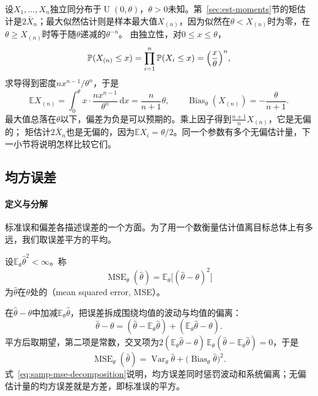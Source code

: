 \begin{example}[均匀分布端点的估计]
\label{ex:samp-uniform-maximum-bias}
设$X_1,\dots,X_n$独立同分布于$\operatorname{U}(0,\theta)$，$\theta>0$未知。第~\ref{sec:est-moments}节的矩估计是$2\bar X_n$；最大似然估计则是样本最大值$X_{(n)}$，因为似然在$\theta<X_{(n)}$时为零，在$\theta\geq X_{(n)}$时等于随$\theta$递减的$\theta^{-n}$。
由独立性，对$0\leq x\leq\theta$，
\[
  \mathbb{P}(X_{(n)}\leq x)=\prod_{i=1}^n\mathbb{P}(X_i\leq x)=\Bigl(\frac x\theta\Bigr)^n,
\]
求导得到密度$nx^{n-1}/\theta^n$，于是
\[
  \mathbb{E}X_{(n)}=\int_0^\theta x\cdot\frac{nx^{n-1}}{\theta^n}\,\mathrm{d}x=\frac{n}{n+1}\theta,\qquad
  \operatorname{Bias}_\theta(X_{(n)})=-\frac{\theta}{n+1}.
\]
最大值总落在$\theta$以下，偏差为负是可以预期的。乘上因子得到$\frac{n+1}{n}X_{(n)}$，它是无偏的；
矩估计$2\bar X_n$也是无偏的，因为$\mathbb{E}X_i=\theta/2$。同一个参数有多个无偏估计量，下一小节将说明怎样比较它们。
\end{example}

\subsection{均方误差}
\label{sec:samp-mse}

\paragraph{定义与分解}
标准误和偏差各描述误差的一个方面。为了用一个数衡量估计值离目标总体上有多远，我们取误差平方的平均。

\begin{definition}[均方误差]
\label{def:samp-mse}
设$\mathbb{E}_\theta\hat\theta^2<\infty$。称
\[
  \operatorname{MSE}_\theta(\hat\theta)=\mathbb{E}_\theta\bigl[(\hat\theta-\theta)^2\bigr]
\]
为$\hat\theta$在$\theta$处的（mean squared error, MSE）。
\end{definition}

在$\hat\theta-\theta$中加减$\mathbb{E}_\theta\hat\theta$，把误差拆成围绕均值的波动与均值的偏离：
\[
  \hat\theta-\theta=(\hat\theta-\mathbb{E}_\theta\hat\theta)+(\mathbb{E}_\theta\hat\theta-\theta).
\]
平方后取期望，第二项是常数，交叉项为$2(\mathbb{E}_\theta\hat\theta-\theta)\,\mathbb{E}_\theta(\hat\theta-\mathbb{E}_\theta\hat\theta)=0$，于是
\begin{equation}
  \operatorname{MSE}_\theta(\hat\theta)=\operatorname{Var}_\theta\hat\theta+\bigl(\operatorname{Bias}_\theta\hat\theta\bigr)^2.
  \label{eq:samp-mse-decomposition}
\end{equation}
式~\eqref{eq:samp-mse-decomposition}说明，均方误差同时惩罚波动和系统偏离；无偏估计量的均方误差就是方差，即标准误的平方。

